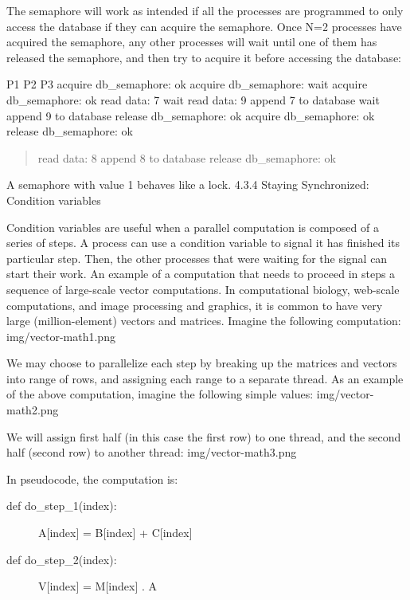 \documentclass[letterpaper,10pt,dvipdfmx]{sphinxmanual}
\begin{document}
The semaphore will work as intended if all the processes are programmed to only access the database if they can acquire the semaphore. Once N=2 processes have acquired the semaphore, any other processes will wait until one of them has released the semaphore, and then try to acquire it before accessing the database:

P1                          P2                           P3
acquire db\_semaphore: ok    acquire db\_semaphore: wait   acquire db\_semaphore: ok
read data: 7                wait                         read data: 9
append 7 to database        wait                         append 9 to database
release db\_semaphore: ok    acquire db\_semaphore: ok     release db\_semaphore: ok
\begin{quote}

read data: 8
append 8 to database
release db\_semaphore: ok
\end{quote}

A semaphore with value 1 behaves like a lock.
4.3.4   Staying Synchronized: Condition variables

Condition variables are useful when a parallel computation is composed of a series of steps. A process can use a condition variable to signal it has finished its particular step. Then, the other processes that were waiting for the signal can start their work. An example of a computation that needs to proceed in steps a sequence of large-scale vector computations. In computational biology, web-scale computations, and image processing and graphics, it is common to have very large (million-element) vectors and matrices. Imagine the following computation:
img/vector-math1.png

We may choose to parallelize each step by breaking up the matrices and vectors into range of rows, and assigning each range to a separate thread. As an example of the above computation, imagine the following simple values:
img/vector-math2.png

We will assign first half (in this case the first row) to one thread, and the second half (second row) to another thread:
img/vector-math3.png

In pseudocode, the computation is:
\begin{description}
\item[{def do\_step\_1(index):}] \leavevmode
A{[}index{]} = B{[}index{]} + C{[}index{]}

\item[{def do\_step\_2(index):}] \leavevmode
V{[}index{]} = M{[}index{]} . A

\end{description}
\end{document}

